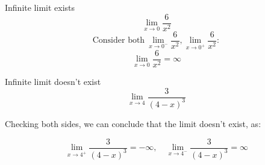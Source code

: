 \documentclass{article}
\begin{document}
\begin{minipage}{0.45\textwidth}
    \begin{example}
        Infinite limit exists
        \[\lim_{x\to 0}\frac{6}{x^2}\]
        \[\text{Consider both}\ \lim_{x\to 0^-}\frac{6}{x^2},\lim_{x\to 0^+}\frac{6}{x^2}:\]
        \[\lim_{x\to 0}\frac{6}{x^2}=\infty\]
    \end{example}
\end{minipage}
\hfill
\begin{minipage}{0.45\textwidth}
    \vspace{10pt}
    \begin{example}
        Infinite limit doesn't exist
        \[\lim_{x\to 4}\frac{3}{(4-x)^3}\]
        \begin{center}
            Checking both sides, we can conclude that the limit doesn't exist, as:
        \end{center}
        \[\lim_{x\to 4^+}\frac{3}{(4-x)^3}=-\infty,\quad\lim_{x\to 4^-}\frac{3}{(4-x)^3}=\infty\]
    \end{example}
\end{minipage}
\end{document}
